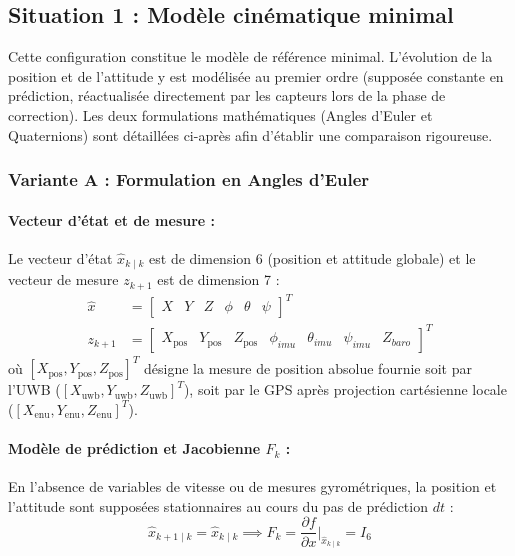 \documentclass[../Formulations_Kalman.tex]{subfiles}
\begin{document}
\subsection{Situation 1 : Modèle cinématique minimal}
Cette configuration constitue le modèle de référence minimal. L'évolution de la position et de l'attitude y est modélisée au premier ordre (supposée constante en prédiction, réactualisée directement par les capteurs lors de la phase de correction). Les deux formulations mathématiques (Angles d'Euler et Quaternions) sont détaillées ci-après afin d'établir une comparaison rigoureuse.

\subsubsection{Variante A : Formulation en Angles d'Euler}

\paragraph{Vecteur d'état et de mesure :}
Le vecteur d'état $\hat{x}_{k\mid k}$ est de dimension 6 (position et attitude globale) et le vecteur de mesure $z_{k+1}$ est de dimension 7 :
\begin{align}
\hat{x} &= \begin{bmatrix} X & Y & Z & \phi & \theta & \psi \end{bmatrix}^T \\
z_{k+1} &= \begin{bmatrix} X_{\text{pos}} & Y_{\text{pos}} & Z_{\text{pos}} & \phi_{imu} & \theta_{imu} & \psi_{imu} & Z_{baro} \end{bmatrix}^T
\end{align}
où $[X_{\text{pos}}, Y_{\text{pos}}, Z_{\text{pos}}]^T$ désigne la mesure de position absolue fournie soit par l'UWB ($[X_{\text{uwb}}, Y_{\text{uwb}}, Z_{\text{uwb}}]^T$), soit par le GPS après projection cartésienne locale ($[X_{\text{enu}}, Y_{\text{enu}}, Z_{\text{enu}}]^T$).

\paragraph{Modèle de prédiction et Jacobienne $F_k$ :}
En l'absence de variables de vitesse ou de mesures gyrométriques, la position et l'attitude sont supposées stationnaires au cours du pas de prédiction $dt$ :
\begin{equation}
\hat{x}_{k+1\mid k} = \hat{x}_{k\mid k} \implies F_k = \frac{\partial f}{\partial x}\bigg|_{\hat{x}_{k\mid k}} = I_6
\end{equation}
\end{document}
